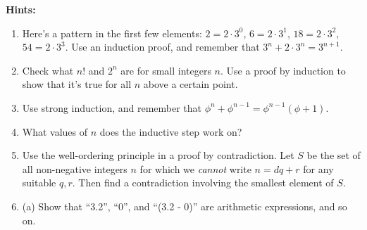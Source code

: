 \documentclass[a4paper,12pt]{article}
\begin{document}
\newpage

{\bf Hints:}
\begin{enumerate}
\item
Here's a pattern in the first few elements:
$2 = 2 \cdot 3^0$, $6 = 2 \cdot 3^1$, $18 = 2 \cdot 3^2$, $54 = 2 \cdot 3^3$.
Use an induction proof, and remember that $3^n + 2 \cdot 3^n = 3^{n+1}$.
\item
Check what $n!$ and $2^n$ are for small integers $n$. Use a proof by induction
to show that it's true for all $n$ above a certain point.
\item
Use strong induction, and remember that
$\phi^n + \phi^{n-1} = \phi^{n-1} (\phi + 1)$.
\item
What values of $n$ does the inductive step work on?
\item
Use the well-ordering principle in a proof by contradiction.
Let $S$ be the set of all non-negative integers $n$ for which we {\em cannot}
write $n = dq+r$ for any suitable $q, r$. Then find a contradiction
involving the smallest element of $S$.
\item
(a) Show that ``3.2'', ``0'', and ``(3.2 - 0)'' are arithmetic expressions, and so on.


\end{enumerate}
\end{document}

